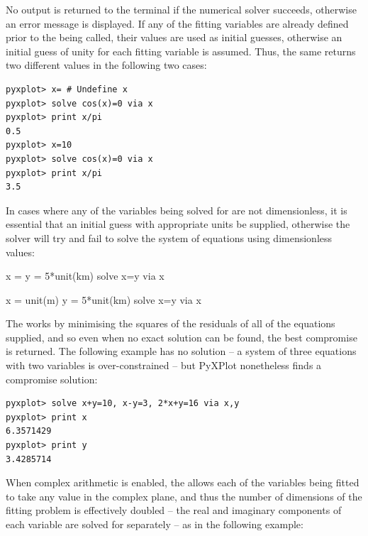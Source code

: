 \noindent No output is returned to the terminal if the numerical solver
succeeds, otherwise an error message is displayed. If any of the fitting
variables are already defined prior to the  being called, their
values are used as initial guesses, otherwise an initial guess of unity for
each fitting variable is assumed. Thus, the same  returns two
different values in the following two cases:

\begin{verbatim}
pyxplot> x= # Undefine x
pyxplot> solve cos(x)=0 via x
pyxplot> print x/pi
0.5
pyxplot> x=10
pyxplot> solve cos(x)=0 via x
pyxplot> print x/pi
3.5
\end{verbatim}

\noindent In cases where any of the variables being solved for are not
dimensionless, it is essential that an initial guess with appropriate units be
supplied, otherwise the solver will try and fail to solve the system of
equations using dimensionless values:

\begin{dontdo}
x =\newline
y = 5*unit(km)\newline
solve x=y via x
\end{dontdo}

\begin{dodo}
x = unit(m)\newline
y = 5*unit(km)\newline
solve x=y via x
\end{dodo}

The  works by minimising the squares of the residuals of all of the
equations supplied, and so even when no exact solution can be found, the best
compromise is returned. The following example has no solution -- a system of
three equations with two variables is over-constrained -- but PyXPlot
nonetheless finds a compromise solution:

\begin{verbatim}
pyxplot> solve x+y=10, x-y=3, 2*x+y=16 via x,y
pyxplot> print x
6.3571429
pyxplot> print y
3.4285714
\end{verbatim}

When complex arithmetic is enabled, the  allows each of the
variables being fitted to take any value in the complex plane, and thus the
number of dimensions of the fitting problem is effectively doubled -- the real
and imaginary components of each variable are solved for separately -- as in
the following example:

